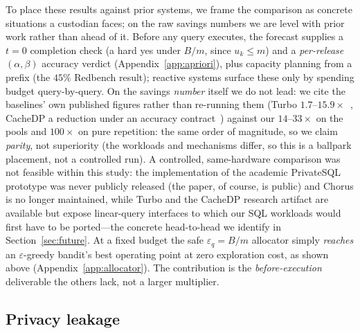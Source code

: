 \documentclass[sigconf,nonacm]{acmart}
\newcommand{\eps}{\varepsilon}
\begin{document}
To place these results against prior systems, we frame the comparison as concrete situations a custodian faces; on the raw savings numbers we are level with prior work rather than ahead of it. Before any query executes, the forecast supplies a $t{=}0$ completion check (a hard yes under $B/m$, since $u_k\le m$) and a \emph{per-release} $(\alpha,\beta)$ accuracy verdict (Appendix~\ref{app:apriori}), plus capacity planning from a prefix (the $45\%$ Redbench result); reactive systems surface these only by spending budget query-by-query. On the savings \emph{number} itself we do not lead: we cite the baselines' own published figures rather than re-running them (Turbo $1.7$--$15.9\times$~\cite{kostopoulou2023turbo}, CacheDP a reduction under an accuracy contract~\cite{mazmudar2023cachedp}) against our $14$--$33\times$ on the pools and $100\times$ on pure repetition: the same order of magnitude, so we claim \emph{parity}, not superiority (the workloads and mechanisms differ, so this is a ballpark placement, not a controlled run). A controlled, same-hardware comparison was not feasible within this study: the implementation of the academic PrivateSQL prototype was never publicly released (the paper, of course, is public) and Chorus is no longer maintained, while Turbo and the CacheDP research artifact are available but expose linear-query interfaces to which our SQL workloads would first have to be ported---the concrete head-to-head we identify in Section~\ref{sec:future}. At a fixed budget the safe $\eps_q{=}B/m$ allocator simply \emph{reaches} an $\eps$-greedy bandit's best operating point at zero exploration cost, as shown above (Appendix~\ref{app:allocator}). The contribution is the \emph{before-execution} deliverable the others lack, not a larger multiplier.

\subsection{Privacy leakage}
\end{document}
